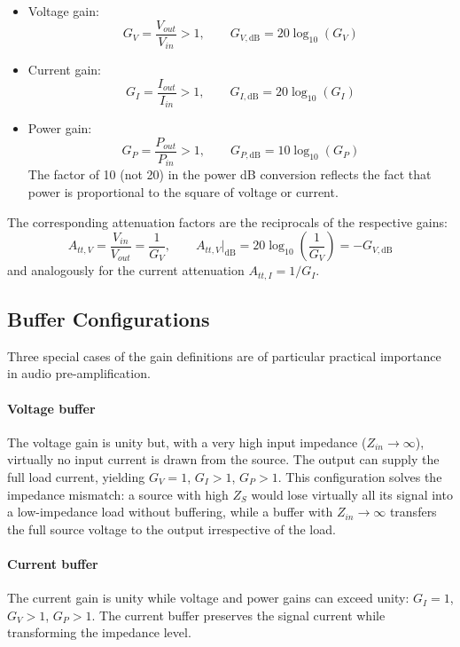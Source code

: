 \begin{itemize}
    \item Voltage gain:
    \[
    G_V = \frac{V_{out}}{V_{in}} > 1,
    \qquad
    G_{V,\mathrm{dB}} = 20\log_{10}\left(G_V\right)
    \]
    \item Current gain:
    \[
    G_I = \frac{I_{out}}{I_{in}} > 1,
    \qquad
    G_{I,\mathrm{dB}} = 20\log_{10}\left(G_I\right)
    \]
    \item Power gain:
    \[
    G_P = \frac{P_{out}}{P_{in}} > 1,
    \qquad
    G_{P,\mathrm{dB}} = 10\log_{10}\left(G_P\right)
    \]
    The factor of 10 (not 20) in the power dB conversion reflects the fact that power is proportional to the square of voltage or current.
\end{itemize}

The corresponding attenuation factors are the reciprocals of the respective gains:
\[
A_{tt,V} = \frac{V_{in}}{V_{out}} = \frac{1}{G_V},
\qquad
A_{tt,V}|_{\mathrm{dB}} = 20\log_{10}\left(\frac{1}{G_V}\right) = -G_{V,\mathrm{dB}}
\]
and analogously for the current attenuation \( A_{tt,I} = 1/G_I \).

\subsection{Buffer Configurations}

Three special cases of the gain definitions are of particular practical importance in audio pre-amplification.

\paragraph{Voltage buffer} The voltage gain is unity but, with a very high input impedance (\( Z_{in} \to \infty \)), virtually no input current is drawn from the source. The output can supply the full load current, yielding \( G_V = 1 \), \( G_I > 1 \), \( G_P > 1 \). This configuration solves the impedance mismatch: a source with high \( Z_S \) would lose virtually all its signal into a low-impedance load without buffering, while a buffer with \( Z_{in} \to \infty \) transfers the full source voltage to the output irrespective of the load.

\paragraph{Current buffer} The current gain is unity while voltage and power gains can exceed unity: \( G_I = 1 \), \( G_V > 1 \), \( G_P > 1 \). The current buffer preserves the signal current while transforming the impedance level.

